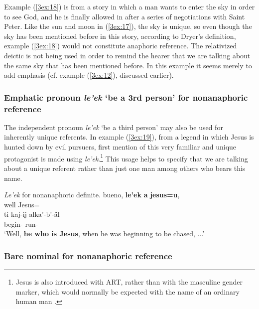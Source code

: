 \documentclass[output=paper]{langsci/langscibook}
\begin{document}
Example (\ref{3ex:18}) is from a story in which a man wants to enter the sky in order to see God, and he is finally allowed in after a series of negotiations with Saint Peter.  Like the sun and moon in (\ref{3ex:17}), the sky is unique, so even though the sky has been mentioned before in this story, according to Dryer's definition, example (\ref{3ex:18}) would not constitute anaphoric reference.  The relativized deictic is not being used in order to remind the hearer that we are talking about the same sky that has been mentioned before.  In this example it seems merely to add emphasis (cf. example (\ref{3ex:12}), discussed earlier).


\subsubsection{Emphatic pronoun {\emph{le'ek}} `be a 3rd person' for nonanaphoric reference}\label{3sec:323}

The independent pronoun {\emph{le'ek}} `be a third person' may also be used for inherently unique referents. In example (\ref{3ex:19}), from a legend in which Jesus is hunted down by evil pursuers, first mention of this very familiar and unique protagonist is made using {\emph{le'ek}}.\footnote{{Jesus is also introduced with ART, rather than with the masculine gender marker, which would normally be expected with the name of an ordinary human man \citep{contini:morava:danziger:18}.}} This usage helps to specify that we are talking about a unique referent rather than just one man among others who bears this name.

\begin{exe}
\ex\label{3ex:19}
{\emph{Le'ek}} for nonanaphoric definite. 
\exi{}
\gll	bueno, 	{\bf{le'ek}} 	{\bf{a}}	{\bf{jesus=u}},  \\
	well		{}	{}	Jesus={} \\
\glt	
\exi{}
\gll	ti 			kaj-ij 					alka'-b'-\"al \\
	{}		begin-{}	run-{} \\
\glt	`Well, {\bf{he who is Jesus}}, when he was beginning to be chased, ...'
\end{exe}

\subsubsection{Bare nominal for nonanaphoric reference}\label{3sec:324}
\end{document}
